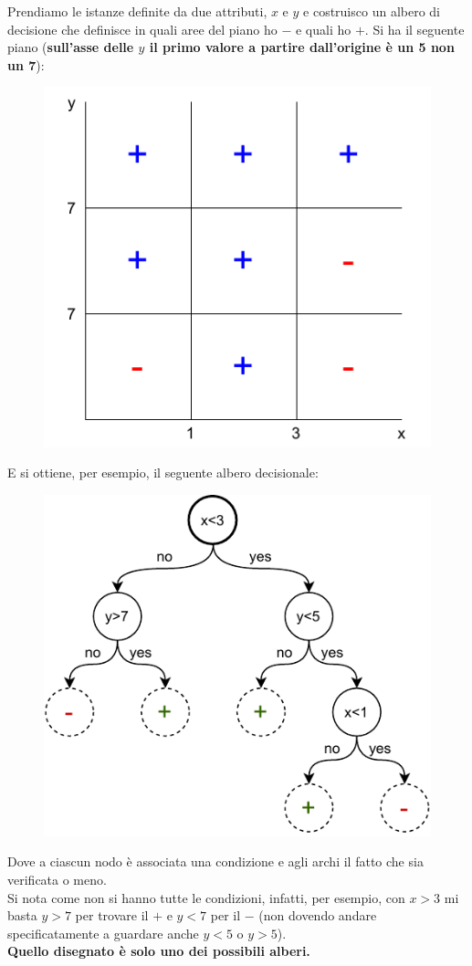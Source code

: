 \documentclass[a4paper,12pt, oneside]{book}
\begin{document}
\begin{esempio}
  Prendiamo le istanze definite da due attributi, $x$ e $y$ e costruisco un
  albero di decisione che definisce in quali aree del piano ho $-$ e quali ho
  $+$.
  \newpage
  Si ha il seguente piano (\textbf{sull'asse delle $y$ il primo valore a partire
  dall'origine è un 5 non un 7}): 
  \begin{figure}[H]
    \centering
    \includegraphics[scale = 0.8]{img/dt3.pdf}
  \end{figure}
  E si ottiene, per esempio, il seguente albero decisionale:
  \begin{figure}[H]
    \centering
    \includegraphics[scale = 0.9]{img/dt4.pdf}
  \end{figure}
  Dove a ciascun nodo è associata una condizione e agli archi il fatto che sia
  verificata o meno.\\
  Si nota come non si hanno tutte le condizioni, infatti, per esempio, con $x>3$
  mi basta $y>7$ per trovare il $+$ e $y<7$ per il $-$ (non dovendo andare
  specificatamente a guardare anche $y<5$ o $y>5$).\\
  \textbf{Quello disegnato è solo uno dei possibili alberi.}
\end{esempio}
\end{document}
